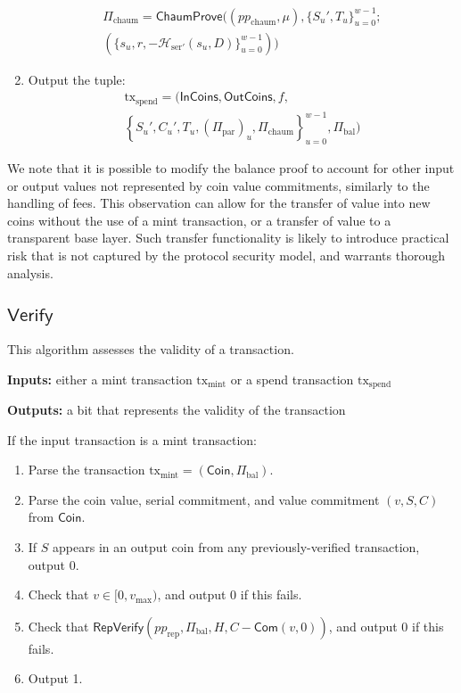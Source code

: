 \documentclass{llncs}
\newcommand{\hash}{\mathcal{H}}
\newcommand{\func}[1]{\mathsf{#1}}
\newcommand{\com}{\func{Com}}
\begin{document}
\begin{enumerate}
    \begin{multline*}
    \Pi_{\text{chaum}} = \func{ChaumProve}((pp_{\text{chaum}}, \mu), \{S_u', T_u\}_{u=0}^{w-1}; \\
    (\{s_u, r, -\hash_{\text{ser}'}(s_u, D)\}_{u=0}^{w-1}))
    \end{multline*}
    \item Output the tuple:
    \begin{multline*}
    \text{tx}_{\text{spend}} = ( \func{InCoins}, \func{OutCoins}, f, \\
    \left\{ S_u', C_u', T_u, (\Pi_{\text{par}})_u, \Pi_{\text{chaum}} \right\}_{u=0}^{w-1}, \Pi_{\text{bal}} )
    \end{multline*}
\end{enumerate}

\begin{remark}
We note that it is possible to modify the balance proof to account for other input or output values not represented by coin value commitments, similarly to the handling of fees.
This observation can allow for the transfer of value into new coins without the use of a mint transaction, or a transfer of value to a transparent base layer.
Such transfer functionality is likely to introduce practical risk that is not captured by the protocol security model, and warrants thorough analysis.
\end{remark}


\subsection{\texorpdfstring{$\func{Verify}$}{Verify}}

This algorithm assesses the validity of a transaction.

\textbf{Inputs:} either a mint transaction $\text{tx}_{\text{mint}}$ or a spend transaction $\text{tx}_{\text{spend}}$

\textbf{Outputs:} a bit that represents the validity of the transaction

If the input transaction is a mint transaction:
\begin{enumerate}
    \item Parse the transaction $\text{tx}_{\text{mint}} = (\func{Coin}, \Pi_{\text{bal}})$.
    \item Parse the coin value, serial commitment, and value commitment $(v,S,C)$ from $\func{Coin}$.
    \item If $S$ appears in an output coin from any previously-verified transaction, output 0.
    \item Check that $v \in [0,v_{\text{max}})$, and output 0 if this fails.
    \item Check that $\func{RepVerify}(pp_{\text{rep}},\Pi_{\text{bal}},H,C - \com(v,0))$, and output 0 if this fails.
    \item Output 1.
\end{enumerate}
\end{document}
